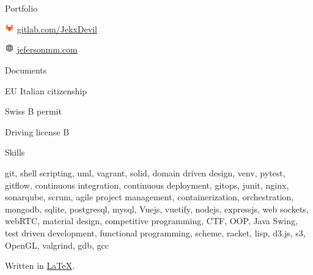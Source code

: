 \documentclass{cv} %
\def\iconsize{0.4cm}
\def\sidespacing{0.5cm}
\begin{document}
\begin{minipage}[b][0.9\paperheight][t]{0.29\linewidth}
\begin{rSection}{Portfolio}
        \item[]\includegraphics[width=\iconsize, trim={0cm 0.5cm 0cm 0cm}]{gitlab-icon.png}
        \href{https://gitlab.com/JekxDevil}{gitlab.com/JekxDevil}

        \item[]\includegraphics[width=\iconsize, trim={0cm 0.12cm 0.03cm 0cm}]{website.png}
        \href{http://jefersonmm.com}{jefersonmm.com}
    \end{rSection}

    \vspace{\sidespacing}

    \begin{rSection}{Documents}
        \item[] EU Italian citizenship
        \item[] Swiss B permit
        \item[] Driving license B
    \end{rSection}

    \tiny
    \begin{rSection}{Skills}
        \item[] git, shell scripting, uml, vagrant, solid, domain driven design,
        venv, pytest, gitflow, continuous integration, continuous deployment,
        gitops, junit, nginx, sonarqube, scrum, agile project management, containerization,
        orchestration,
        mongodb, sqlite, postgresql, mysql, %
        Vuejs, vuetify, nodejs, expressjs, web sockets, webRTC, material design, %
        competitive programming, CTF, OOP, Java Swing, test driven development,
        functional programming, scheme, racket, lisp, d3.js, s3, OpenGL, valgrind, gdb, gcc
    \end{rSection}
    \normalsize

    \vspace{2.5cm}
    Written in \href{https://github.com/JekxDevil/curriculum-vitae}{\LaTeX}.

\end{minipage}
\hspace{0.1cm}
\end{document}
